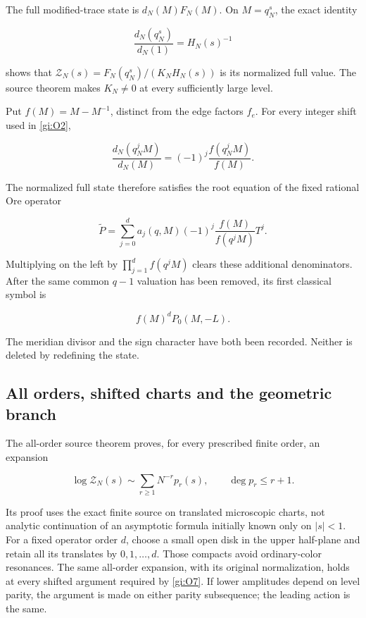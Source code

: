 The full modified-trace state is \(d_N(M)F_N(M)\). On
\(M=q_N^s\), the exact identity

\begin{equation}\label{gi:O5}
\frac{d_N(q_N^s)}{d_N(1)}=H_N(s)^{-1}
\end{equation}

shows that
\(\mathcal Z_N(s)=F_N(q_N^s)/(K_NH_N(s))\) is its normalized
full value. The source theorem makes \(K_N\ne0\) at every
sufficiently large level.

Put \(f(M)=M-M^{-1}\), distinct from the edge factors \(f_e\).
For every integer shift used in \eqref{gi:O2},

\begin{equation}\label{gi:O6}
\frac{d_N(q_N^jM)}{d_N(M)}
        =(-1)^j\frac{f(q_N^jM)}{f(M)}.
\end{equation}

The normalized full state therefore satisfies the root equation
of the fixed rational Ore operator

\begin{equation}\label{gi:O7}
\widetilde P=
   \sum_{j=0}^{d}a_j(q,M)(-1)^j
                        \frac{f(M)}{f(q^jM)}T^j.
\end{equation}

Multiplying on the left by \(\prod_{j=1}^{d}f(q^jM)\)
clears these additional denominators. After the same common
\(q-1\) valuation has been removed, its first classical symbol is

\begin{equation}\label{gi:O8}
f(M)^dP_0(M,-L).
\end{equation}

The meridian divisor and the sign character have both been
recorded. Neither is deleted by redefining the state.

\subsection{All orders, shifted charts and the geometric branch}\label{gi:all-orders-shifted-charts-and-the-geometric-branch}

The all-order source theorem proves, for every prescribed finite
order, an expansion

\begin{equation}\label{gi:O9}
\log\mathcal Z_N(s)\sim
       \sum_{r\ge1}N^{-r}p_r(s),\qquad \deg p_r\le r+1.
\end{equation}

Its proof uses the exact finite source on translated microscopic
charts, not analytic continuation of an asymptotic formula initially
known only on \(|s|<1\). For a fixed operator order \(d\), choose
a small open disk in the upper half-plane and retain all its
translates by \(0,1,\ldots,d\). Those compacts avoid ordinary-color
resonances. The same all-order expansion, with its original
normalization, holds at every shifted argument required by \eqref{gi:O7}.
If lower amplitudes depend on level parity, the argument is made
on either parity subsequence; the leading action is the same.

